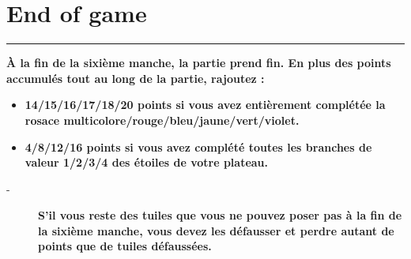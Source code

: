 \documentclass{scrartcl}%
\begin{document}
%
\section{ End of game
}%
\label{sec:Endofgame}%
\rule{18cm}{0.07cm}\break%
\textbf{À la fin de la sixième manche, la partie prend fin. En plus des points accumulés tout au long de la partie, rajoutez :}%

%
\begin{itemize}%
\item%
%
\textbf{14/15/16/17/18/20 points si vous avez entièrement complétée la rosace multicolore/rouge/bleu/jaune/vert/violet.}%

%
\item%
%
\textbf{4/8/12/16 points si vous avez complété toutes les branches de valeur 1/2/3/4 des étoiles de votre plateau.}%

%
\end{itemize}%
\begin{description}%
\item[{-} ]%
%
\textbf{S'il vous reste des tuiles que vous ne pouvez poser pas à la fin de la sixième manche, vous devez les défausser et perdre autant de points que de tuiles défaussées.}%
\end{description}

%
\end{document}
